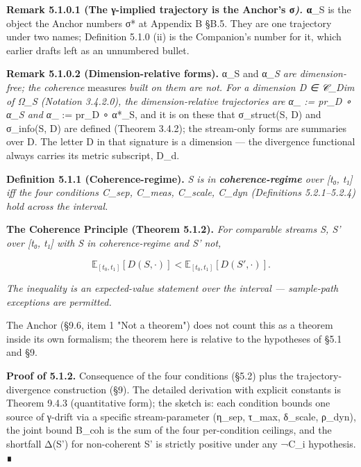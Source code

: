 \documentclass[11pt, openany]{book}
\begin{document}
\textbf{Remark 5.1.0.1 (The γ-implied trajectory is the Anchor's σ\textit{).} α}\_\allowbreak{}S is the object the Anchor numbers σ* at Appendix B §B.5. They are one trajectory under two names; Definition 5.1.0 (ii) is the Companion's number for it, which earlier drafts left as an unnumbered bullet.

\textbf{Remark 5.1.0.2 (Dimension-relative forms).} α\_\allowbreak{}S and α\textit{\_\allowbreak{}S are dimension-free; the coherence }measures\textit{ built on them are not. For a dimension D ∈ 𝒞\_\allowbreak{}Dim of Ω\_\allowbreak{}S (Notation 3.4.2.0), the dimension-relative trajectories are α\_ := pr\_\allowbreak{}D ∘ α\_\allowbreak{}S and α}\_ := pr\_\allowbreak{}D ∘ α*\_\allowbreak{}S, and it is on these that σ\_\allowbreak{}struct(S, D) and σ\_\allowbreak{}info(S, D) are defined (Theorem 3.4.2); the stream-only forms are summaries over D. The letter D in that signature is a dimension --- the divergence functional always carries its metric subscript, D\_\allowbreak{}d.

\textbf{Definition 5.1.1 (Coherence-regime).} \textit{S is in \textbf{coherence-regime} over [t₀, t₁] iff the four conditions C\_\allowbreak{}sep, C\_\allowbreak{}meas, C\_\allowbreak{}scale, C\_\allowbreak{}dyn (Definitions 5.2.1–5.2.4) hold across the interval.}

\textbf{The Coherence Principle (Theorem 5.1.2).} \textit{For comparable streams S, S' over [t₀, t₁] with S in coherence-regime and S' not,}

\[
\mathbb{E}_{[t_0, t_1]}[D(S, \cdot)] < \mathbb{E}_{[t_0, t_1]}[D(S', \cdot)].
\]

\textit{The inequality is an expected-value statement over the interval --- sample-path exceptions are permitted.}

The Anchor (§9.6, item 1 "Not a theorem") does not count this as a theorem inside its own formalism; the theorem here is relative to the hypotheses of §5.1 and §9.

\textbf{Proof of 5.1.2.} Consequence of the four conditions (§5.2) plus the trajectory-divergence construction (§9). The detailed derivation with explicit constants is Theorem 9.4.3 (quantitative form); the sketch is: each condition bounds one source of γ-drift via a specific stream-parameter (η\_\allowbreak{}sep, τ\_\allowbreak{}max, δ\_\allowbreak{}scale, ρ\_\allowbreak{}dyn), the joint bound B\_\allowbreak{}coh is the sum of the four per-condition ceilings, and the shortfall Δ(S') for non-coherent S' is strictly positive under any ¬C\_\allowbreak{}i hypothesis. ∎
\end{document}
